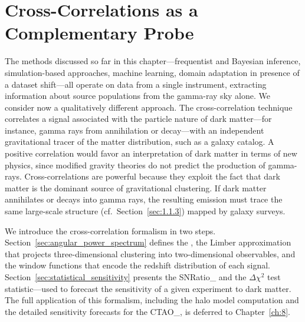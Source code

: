 
\section{Cross-Correlations as a Complementary Probe}
\label{sec:cross_correlations}

The methods discussed so far in this chapter---frequentist and Bayesian inference, simulation-based approaches, machine learning, domain adaptation in presence of a dataset shift---all operate on data from a single instrument, extracting information about source populations from the gamma-ray sky alone.
We consider now a qualitatively different approach. The cross-correlation technique correlates a signal associated with the particle nature of dark matter---for instance, gamma rays from annihilation or decay---with an independent gravitational tracer of the matter distribution, such as a galaxy catalog. A positive correlation would favor an interpretation of dark matter in terms of new physics, since modified gravity theories do not predict the production of gamma-rays.
Cross-correlations are powerful because they exploit the fact that dark matter is the dominant source of gravitational clustering.
If dark matter annihilates or decays into gamma rays, the resulting emission must trace the same large-scale structure (cf.\ Section~\ref{sec:1.1.3}) mapped by galaxy surveys.

We introduce the cross-correlation formalism in two steps.
Section~\ref{sec:angular_power_spectrum} defines the \APS, the Limber approximation that projects three-dimensional clustering into two-dimensional observables, and the window functions that encode the redshift distribution of each signal.
Section~\ref{sec:statistical_sensitivity} presents the \gls{SNRatio_} and the $\Delta\chi^2$ test statistic---used to forecast the sensitivity of a given experiment to dark matter.
The full application of this formalism, including the halo model computation and the detailed sensitivity forecasts for the \gls{CTAO_}, is deferred to Chapter~\ref{ch:8}.

